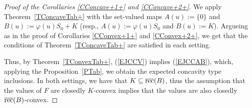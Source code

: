\documentclass[12pt,reqno]{amsart}
\newcommand{\rec}{\mathop{\hbox{\rm rec}}\nolimits}
\def\thm#1{Theorem~\ref{T#1}}
\def\prp#1{Proposition~\ref{P#1}}
\theoremstyle{definition}
\def\eq#1{{\rm(\ref{E#1})}}
\begin{document}
\begin{proof}[Proof of the Corollaries \ref{CConcave+1+} and \ref{CConcave+2+}]
We apply \thm{ConcaveTab+} with the set-valued maps $A(u):=\{0\}$ and $B(u):=\varphi(u)S_0+K$ 
(resp., $A(u):=\varphi(u)S_0$ and $B(u):=K$). Argueing as in the proof of Corollaries \ref{CConvex+1+} 
and \ref{CConvex+2+}, we get that the conditions of \thm{ConcaveTab+} are satisfied in each setting.

Thus, by \thm{ConvexTab+}, \eq{JCCV} implies \eq{JCCAB}, which, applying the \prp{Tab}, we obtain 
the expected concavity type inclusions. In both settings, we have that $K\subseteq\overline{\rec}(B)$, thus
the assumption that the values of $F$ are closedly $K$-convex implies that the values are also closedly 
$\overline{\rec}(B)$-convex.
\end{proof}


%
%
\end{document}
